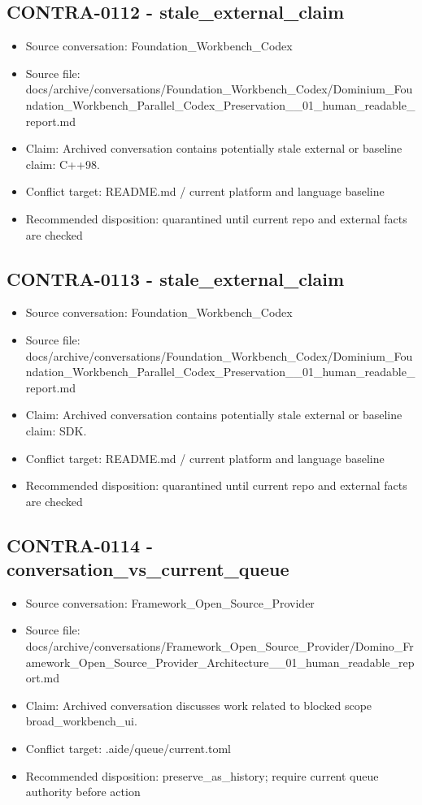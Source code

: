 \documentclass[11pt,a4paper]{report}
\begin{document}
\subsection{CONTRA-0112 - stale\_external\_claim}

\begin{itemize}
\item Source conversation: Foundation\_Workbench\_Codex
\item Source file: docs/archive/conversations/Foundation\_Workbench\_Codex/Dominium\_Foundation\_Workbench\_Parallel\_Codex\_Preservation\_\_01\_human\_readable\_report.md
\item Claim: Archived conversation contains potentially stale external or baseline claim: C++98.
\item Conflict target: README.md / current platform and language baseline
\item Recommended disposition: quarantined until current repo and external facts are checked
\end{itemize}

\subsection{CONTRA-0113 - stale\_external\_claim}

\begin{itemize}
\item Source conversation: Foundation\_Workbench\_Codex
\item Source file: docs/archive/conversations/Foundation\_Workbench\_Codex/Dominium\_Foundation\_Workbench\_Parallel\_Codex\_Preservation\_\_01\_human\_readable\_report.md
\item Claim: Archived conversation contains potentially stale external or baseline claim: SDK.
\item Conflict target: README.md / current platform and language baseline
\item Recommended disposition: quarantined until current repo and external facts are checked
\end{itemize}

\subsection{CONTRA-0114 - conversation\_vs\_current\_queue}

\begin{itemize}
\item Source conversation: Framework\_Open\_Source\_Provider
\item Source file: docs/archive/conversations/Framework\_Open\_Source\_Provider/Domino\_Framework\_Open\_Source\_Provider\_Architecture\_\_01\_human\_readable\_report.md
\item Claim: Archived conversation discusses work related to blocked scope broad\_workbench\_ui.
\item Conflict target: .aide/queue/current.toml
\item Recommended disposition: preserve\_as\_history; require current queue authority before action
\end{itemize}
\end{document}
